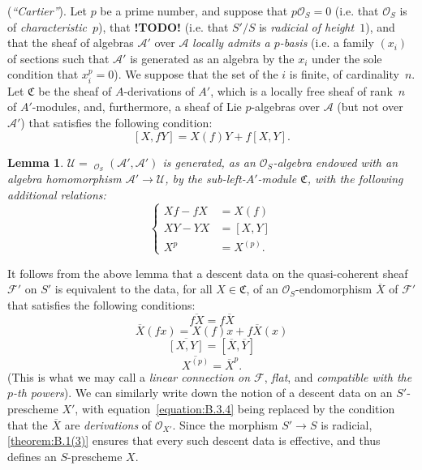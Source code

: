 \documentclass{article}
\theoremstyle{plain}
\newtheorem*{lemma*}{Lemma}
\theoremstyle{definition}
\newenvironment{example}[1]
  {\renewcommand\theinnercustomexample{#1}\innercustomexample}
  {\endinnercustomexample}
\newcommand{\sh}[1]{{\mathscr{#1}}}
\newcommand{\fk}[1]{{\mathfrak{#1}}}
\DeclareMathOperator{\Hom}{Hom}
\DeclareMathOperator{\shHom}{\underline{\Hom}}
\newcommand{\todo}{\textbf{ !TODO! }}
\newcommand{\oldpage}[1]{\marginpar{\footnotesize$\Big\vert$ \textit{p.~#1}}}
\begin{document}
\begin{example}{2}
\label{example:B.3(2)}
  (\emph{``Cartier''}).
  Let $p$ be a prime number, and suppose that $p\sh{O}_S=0$ (i.e. that $\sh{O}_S$ is of \emph{characteristic~$p$}), that \todo (i.e. that $S'/S$ is \emph{radicial of height~$1$}), and that the sheaf of algebras $\sh{A}'$ over $\sh{A}$ \emph{locally admits a $p$-basis} (i.e. a family $(x_i)$ of sections such that $\sh{A}'$ is generated as an algebra by the $x_i$ under the sole condition that $x_i^p=0$).
  We suppose that the set of the $i$ is finite, of cardinality~$n$.
  Let $\fk{C}$ be the sheaf of $A$-derivations of $A'$, which is a locally free sheaf of rank~$n$ of $A'$-modules, and, furthermore, a sheaf of Lie $p$-algebras over $\sh{A}$ (but not over $\sh{A}'$) that satisfies the following condition:
  \[
  \label{equation:B.3.5}
    [X,fY] = X(f)Y + f[X,Y].
  \tag{3.5}
  \]
\end{example}

\begin{lemma*}
  $\sh{U}=\shHom_{\sh{O}_S}(\sh{A}',\sh{A}')$ is generated, as an $\sh{O}_S$-algebra endowed with an algebra homomorphism $\sh{A}'\to\sh{U}$, by the sub-left-$A'$-module $\fk{C}$, with the following additional relations:
  \[
  \label{equation:B.3.6}
    \begin{cases}
      Xf-fX &= X(f)
    \\XY-YX &= [X,Y]
    \\X^p &= X^{(p)}.
    \end{cases}
  \tag{3.6}
  \]
\end{lemma*}

It follows from the above lemma that a descent data on the quasi-coherent sheaf $\sh{F}'$ on $S'$ is equivalent to the data, for all $X\in\fk{C}$, of an $\sh{O}_S$-endomorphism $\overline{X}$ of $\sh{F}'$ that satisfies the following conditions:
\[
\label{equation:B.3.7}
  \overline{fX} = f\overline{X}
\tag{3.7}
\]
\[
\label{equation:B.3.8}
  \overline{X}(fx) = X(f)x + f\overline{X}(x)
\tag{3.8}
\]
\[
\label{equation:B.3.9}
  \overline{[X,Y]} = [\overline{X},\overline{Y}]
\tag{3.9}
\]
\[
\label{equation:B.3.10}
  \overline{X^{(p)}} = \overline{X}^p.
\tag{3.10}
\]
(This is what we may call a \emph{linear connection on $\sh{F}$}, \emph{flat}, and \emph{compatible with the $p$-th powers}).
We can similarly write down the notion of a descent data on an $S'$-prescheme $X'$, with equation~\cref{equation:B.3.4} being replaced by the condition that the $\overline{X}$ are \emph{derivations} of $\sh{O}_{X'}$.
Since the morphism $S'\to S$ is radicial, \cref{theorem:B.1(3)} ensures that every such descent data is
\oldpage{190-24}
effective, and thus defines an $S$-prescheme $X$.
\end{document}
